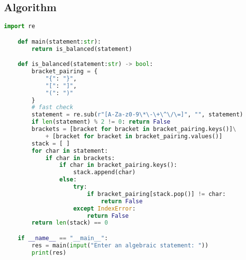\documentclass{report}
\begin{document}
\subsection{Algorithm}
\begin{lstlisting}[language=Python]
	import re

	def main(statement:str):
		return is_balanced(statement)

	def is_balanced(statement:str) -> bool:
		bracket_pairing = {
			"{": "}",
			"[": "]",
			"(": ")"
		}
		# fast check
		statement = re.sub(r"[A-Za-z0-9\*\-\+\^\/\=]", "", statement)
		if len(statement) % 2 != 0: return False
		brackets = [bracket for bracket in bracket_pairing.keys()]\
			+ [bracket for bracket in bracket_pairing.values()]
		stack = [ ]
		for char in statement:
			if char in brackets:
				if char in bracket_pairing.keys():
					stack.append(char)
				else:
					try:
						if bracket_pairing[stack.pop()] != char:
							return False
					except IndexError:
						return False
		return len(stack) == 0

	if __name__ == "__main__":
		res = main(input("Enter an algebraic statement: "))
		print(res)
\end{lstlisting}
\end{document}
